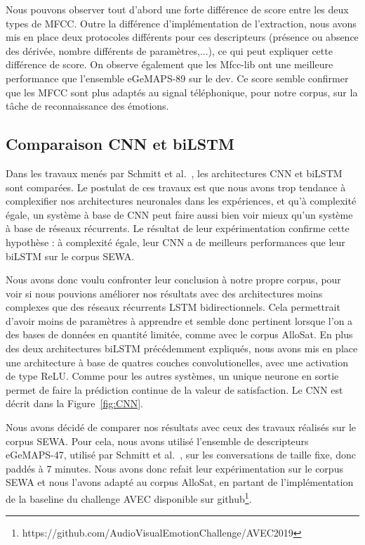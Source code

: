 

Nous pouvons observer tout d'abord une forte différence de score entre les deux types de MFCC. Outre la différence d'implémentation de l'extraction, nous avons mis en place deux protocoles différents pour ces descripteurs (présence ou absence des dérivée, nombre différents de paramètres,...), ce qui peut expliquer cette différence de score. On observe également que les Mfcc-lib ont une meilleure performance que l'ensemble eGeMAPS-89 sur le dev. Ce score semble confirmer que les MFCC sont plus adaptés au signal téléphonique, pour notre corpus, sur la tâche de reconnaissance des émotions.

\subsection{Comparaison CNN et biLSTM}
Dans les travaux menés par Schmitt et al.~\cite{Schmitt2019}, les architectures CNN et biLSTM sont comparées. Le postulat de ces travaux est que nous avons trop tendance à complexifier nos architectures neuronales dans les expériences, et qu'à complexité égale, un système à base de CNN peut faire aussi bien voir mieux qu'un système à base de réseaux récurrents. Le résultat de leur expérimentation confirme cette hypothèse : à complexité égale, leur CNN a de meilleurs performances que leur biLSTM sur le corpus SEWA.

Nous avons donc voulu confronter leur conclusion à notre propre corpus, pour voir si nous pouvions améliorer nos résultats avec des architectures moins complexes que des réseaux récurrents LSTM bidirectionnels. Cela permettrait d'avoir moins de paramètres à apprendre et semble donc pertinent lorsque l'on a des bases de données en quantité limitée, comme avec le corpus AlloSat. En plus des deux architectures biLSTM précédemment expliqués, nous avons mis en place une architecture à base de quatres couches convolutionelles, avec une activation de type ReLU. Comme pour les autres systèmes, un unique neurone en sortie permet de faire la prédiction continue de la valeur de satisfaction. Le CNN est décrit dans la Figure~\ref{fig:CNN}.



Nous avons décidé de comparer nos résultats avec ceux des travaux réalisés sur le corpus SEWA. Pour cela, nous avons utilisé l'ensemble de descripteurs eGeMAPS-47, utilisé par Schmitt et al.~\cite{Schmitt2019}, sur les conversations de taille fixe, donc paddés à 7 minutes. Nous avons donc refait leur expérimentation sur le corpus SEWA et nous l'avons adapté au corpus AlloSat, en partant de l'implémentation de la baseline du challenge AVEC disponible sur github\footnote{https://github.com/AudioVisualEmotionChallenge/AVEC2019}.

